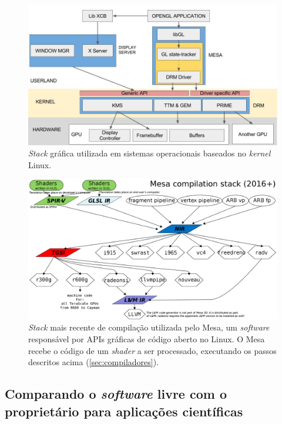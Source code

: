\documentclass[10pt, a4paper, conference, onecolumn]{IEEEtran}
\begin{document}
\begin{multicols}{2}
    \begin{figure}[H]
    \includegraphics[width=\linewidth]{linux-stack.jpeg}
    \caption{\textit{Stack} gráfica utilizada em sistemas operacionais baseados
        no \textit{kernel} Linux.}
    \label{fig:linux-gs}
    \end{figure}
    
    \columnbreak

    \begin{figure}[H]
    \includegraphics[width=\linewidth]{mesa.png}
    \caption{\textit{Stack} mais recente de compilação utilizada pelo Mesa, um
        \textit{software} responsável por APIs gráficas de código aberto no
        Linux. O Mesa recebe o código de um \textit{shader} a ser processado,
        executando os passos descritos acima (\ref{sec:compiladores}).}
    \label{fig:mesa-cs}
    \end{figure}
\end{multicols}

\subsection{Comparando o \textit{software} livre com o proprietário para aplicações científicas}
\end{document}
